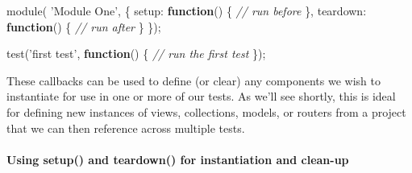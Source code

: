 \documentclass[9pt]{book}
\newenvironment{Shaded}{}{}
\newcommand{\KeywordTok}[1]{\textcolor[rgb]{0.00,0.44,0.13}{\textbf{{#1}}}}
\newcommand{\DataTypeTok}[1]{\textcolor[rgb]{0.56,0.13,0.00}{{#1}}}
\newcommand{\StringTok}[1]{\textcolor[rgb]{0.25,0.44,0.63}{{#1}}}
\newcommand{\CommentTok}[1]{\textcolor[rgb]{0.38,0.63,0.69}{\textit{{#1}}}}
\newcommand{\FunctionTok}[1]{\textcolor[rgb]{0.02,0.16,0.49}{{#1}}}
\newcommand{\NormalTok}[1]{{#1}}
\begin{document}
\begin{Shaded}
\begin{Highlighting}[]
\FunctionTok{module}\NormalTok{( }\StringTok{'Module One'}\NormalTok{, \{}
    \DataTypeTok{setup}\NormalTok{: }\KeywordTok{function}\NormalTok{() \{}
        \CommentTok{// run before}
    \NormalTok{\},}
    \DataTypeTok{teardown}\NormalTok{: }\KeywordTok{function}\NormalTok{() \{}
        \CommentTok{// run after}
    \NormalTok{\}}
\NormalTok{\});}

\FunctionTok{test}\NormalTok{(}\StringTok{'first test'}\NormalTok{, }\KeywordTok{function}\NormalTok{() \{}
    \CommentTok{// run the first test}
\NormalTok{\});}
\end{Highlighting}
\end{Shaded}

These callbacks can be used to define (or clear) any components we wish
to instantiate for use in one or more of our tests. As we'll see
shortly, this is ideal for defining new instances of views, collections,
models, or routers from a project that we can then reference across
multiple tests.

\paragraph{Using setup() and teardown() for instantiation and
clean-up}\label{using-setup-and-teardown-for-instantiation-and-clean-up}
\end{document}
